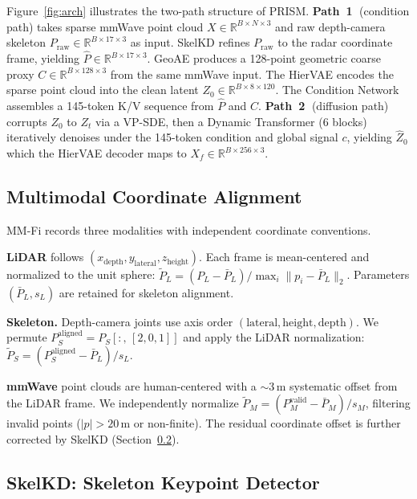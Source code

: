 \documentclass{article}
\newcommand{\Rbb}{\mathbb{R}}
\begin{document}
Figure~\ref{fig:arch} illustrates the two-path structure of PRISM.
\textbf{Path~\textcircled{1}} (condition path) takes sparse mmWave point cloud
$X\!\in\!\Rbb^{B\times N\times3}$ and raw depth-camera skeleton
$P_\text{raw}\!\in\!\Rbb^{B\times17\times3}$ as input.
SkelKD refines $P_\text{raw}$ to the radar coordinate frame, yielding
$\hat{P}\!\in\!\Rbb^{B\times17\times3}$.
GeoAE produces a 128-point geometric coarse proxy
$C\!\in\!\Rbb^{B\times128\times3}$ from the same mmWave input.
The HierVAE encodes the sparse point cloud into the clean latent
$Z_0\!\in\!\Rbb^{B\times8\times120}$.
The Condition Network assembles a 145-token K/V sequence from $\hat{P}$ and $C$.
\textbf{Path~\textcircled{2}} (diffusion path) corrupts $Z_0$ to $Z_t$ via a
VP-SDE, then a Dynamic Transformer (6 blocks) iteratively denoises under the
145-token condition and global signal $c$, yielding $\hat{Z}_0$ which the
HierVAE decoder maps to $X_f\!\in\!\Rbb^{B\times256\times3}$.

\subsection{Multimodal Coordinate Alignment}
\label{sec:align}

MM-Fi records three modalities with independent coordinate conventions.

\textbf{LiDAR} follows $(x_\text{depth}, y_\text{lateral}, z_\text{height})$.
Each frame is mean-centered and normalized to the unit sphere:
$\tilde{P}_L = (P_L - \bar{P}_L) / \max_i \|p_i - \bar{P}_L\|_2$.
Parameters $(\bar{P}_L, s_L)$ are retained for skeleton alignment.

\textbf{Skeleton.}
Depth-camera joints use axis order $(\text{lateral}, \text{height}, \text{depth})$.
We permute $P_S^{\text{aligned}} = P_S[:,\,[2,0,1]]$ and apply the LiDAR
normalization: $\tilde{P}_S = (P_S^{\text{aligned}} - \bar{P}_L) / s_L$.

\textbf{mmWave} point clouds are human-centered with a $\sim$3\,m systematic
offset from the LiDAR frame.
We independently normalize $\tilde{P}_M = (P_M^{\text{valid}} - \bar{P}_M)/s_M$,
filtering invalid points ($|p|>20$\,m or non-finite).
The residual coordinate offset is further corrected by SkelKD
(Section~\ref{sec:skelkd}).

\subsection{SkelKD: Skeleton Keypoint Detector}
\label{sec:skelkd}
\end{document}
